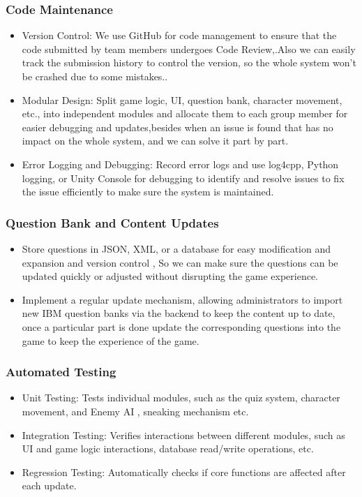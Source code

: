 \documentclass[11pt, a4paper]{article}
\begin{document}
\subsubsection{Code Maintenance}

\begin{itemize}
    \item Version Control: We use GitHub for code management to ensure that the code submitted by team members undergoes Code Review,.Also we can easily track the submission history to control the version, so the whole system won’t be crashed due to some mistakes..
    \item Modular Design:  Split game logic, UI, question bank, character movement, etc., into independent modules and allocate them to each group member for easier debugging and updates,besides when an issue is found that has no impact on the whole system, and we can solve it part by part.
    \item Error Logging and Debugging: Record error logs and use log4cpp, Python logging, or Unity Console for debugging to identify and resolve issues to fix the issue efficiently to make sure the system is maintained.
\end{itemize}

\subsubsection{Question Bank and Content Updates}

\begin{itemize}
    \item Store questions in JSON, XML, or a database for easy modification and expansion and version control , So we can make sure the questions can be updated quickly or adjusted without disrupting the game experience.
    \item Implement a regular update mechanism, allowing administrators to import new IBM question banks via the backend to keep the content up to date, once a particular part is done update the corresponding questions into the game to keep the experience of the game.
\end{itemize}

\subsubsection{Automated Testing}


\begin{itemize}
    \item Unit Testing:  Tests individual modules, such as the quiz system, character movement, and Enemy AI , sneaking mechanism etc.
    \item Integration Testing: Verifies interactions between different modules, such as UI and game logic interactions, database read/write operations, etc.
    \item Regression Testing: Automatically checks if core functions are affected after each update.
\end{itemize}
\end{document}
